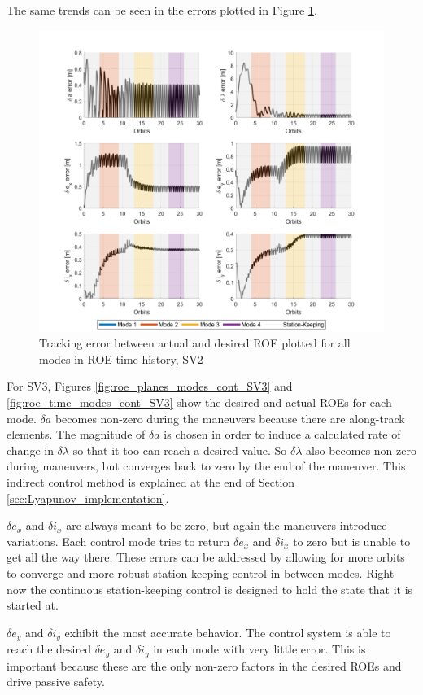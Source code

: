 The same trends can be seen in the errors plotted in Figure \ref{fig:roe_error_time_modes_cont_SV2}. 
\begin{figure}[H]
    \centering
    \includegraphics[width=0.75\linewidth]{sim/figures/PS6/ROE_error_over_time_modes_SV2.png}
    \caption{Tracking error between actual and desired ROE plotted for all modes in ROE time history, SV2}
    \label{fig:roe_error_time_modes_cont_SV2}
\end{figure}

For SV3, Figures \ref{fig:roe_planes_modes_cont_SV3} and \ref{fig:roe_time_modes_cont_SV3} show the desired and actual ROEs for each mode. $\delta a$ becomes non-zero during the maneuvers because there are along-track elements. The magnitude of $\delta a$ is chosen in order to induce a calculated rate of change in $\delta \lambda$ so that it too can reach a desired value. So $\delta \lambda$ also becomes non-zero during maneuvers, but converges back to zero by the end of the maneuver. This indirect control method is explained at the end of Section \ref{sec:Lyapunov_implementation}. 

$\delta e_x$ and $\delta i_x$ are always meant to be zero, but again the maneuvers introduce variations. Each control mode tries to return $\delta e_x$ and $\delta i_x$ to zero but is unable to get all the way there. These errors can be addressed by allowing for more orbits to converge and more robust station-keeping control in between modes. Right now the continuous station-keeping control is designed to hold the state that it is started at. 

$\delta e_y$ and $\delta i_y$ exhibit the most accurate behavior. The control system is able to reach the desired $\delta e_y$ and $\delta i_y$ in each mode with very little error. This is important because these are the only non-zero factors in the desired ROEs and drive passive safety. 

